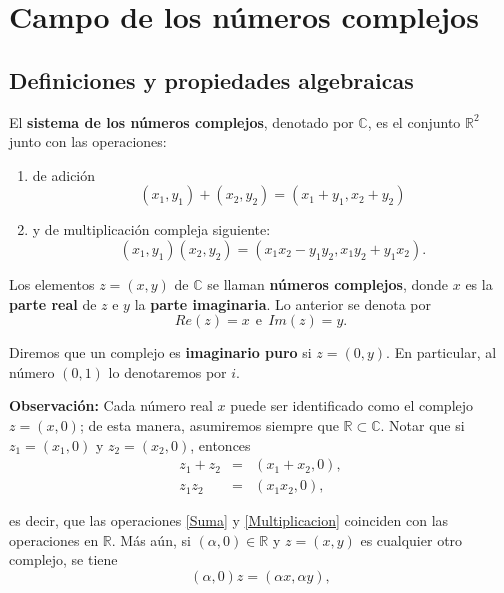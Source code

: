 \chapter{Campo de los números complejos}

\section{Definiciones y propiedades algebraicas}

\begin{defi}
El \textbf{sistema de los números complejos}, denotado por $\mathbb{C}$, es el conjunto $\mathbb{R}^2$ junto con las operaciones:

\begin{enumerate}
\item de adición
\begin{equation}
(x_1, y_1) + (x_2,y_2) = (x_1 + y_1, x_2 + y_2) \label{Suma}
\end{equation}

\item y de multiplicación compleja siguiente:
\begin{equation}
(x_1, y_1) (x_2,y_2) = (x_1 x_2 - y_1y_2, x_1 y_2 + y_1x_2). \label{Multiplicacion}
\end{equation}

\end{enumerate}

Los elementos $z = (x,y)$ de $\mathbb{C}$ se llaman \textbf{números complejos}, donde $x$ es la \textbf{parte real} de $z$ e $y$ la \textbf{parte imaginaria}. Lo anterior se denota por
$$Re(z) = x ~~\mbox{e}~~ Im(z) = y.$$

Diremos que un complejo es \textbf{imaginario puro} si $z = (0,y)$. En particular, al número $(0,1)$ lo denotaremos por $i$.
\end{defi}

\textbf{Observación:} Cada número real $x$ puede ser identificado como el complejo $z = (x,0)$; de esta manera, asumiremos siempre que $\mathbb{R} \subset \mathbb{C}$. Notar que si $z_1 = (x_1,0)$ y $z_2 = (x_2,0)$, entonces
\begin{eqnarray*}
z_1 + z_2 &=& (x_1 + x_2, 0), \\
z_1z_2 &=& (x_1x_2, 0),
\end{eqnarray*}

es decir, que las operaciones \eqref{Suma} y \eqref{Multiplicacion} coinciden con las operaciones en $\mathbb{R}$. Más aún, si $(\alpha,0) \in \mathbb{R}$ y $z = (x,y)$ es cualquier otro complejo, se tiene
$$(\alpha,0)z = (\alpha x, \alpha y),$$

